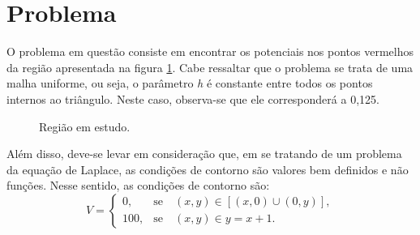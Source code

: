 \documentclass[a4paper,11pt]{article}
\begin{document}
\section{Problema}
    O problema em questão consiste em encontrar os potenciais nos pontos vermelhos da região apresentada na figura \ref{problema}. Cabe ressaltar que o problema se trata de uma malha uniforme, ou seja, o parâmetro \textit{h} é constante entre todos os pontos internos ao triângulo. Neste caso, observa-se que ele corresponderá a 0,125.
    \begin{figure}[H]
        \centering
        \caption[width=\columnwidth]{Região em estudo.}
        \label{problema}
    \end{figure}
    
    Além disso, deve-se levar em consideração que, em se tratando de um problema da equação de Laplace, as condições de contorno são valores bem definidos e não funções. Nesse sentido, as condições de contorno são:\\
        \[
        V=
        \begin{cases}
        0,&\mbox{se}\quad (x,y)\in{[(x,0) \cup (0,y)]},\\
        100, &\mbox{se}\quad (x,y)\in{y=x+1}.
        \end{cases}
        \]
        
\end{document}

